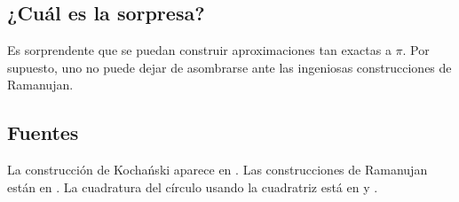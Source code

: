 \subsection*{¿Cuál es la sorpresa?}

Es sorprendente que se puedan construir aproximaciones tan exactas a $\pi$. Por supuesto, uno no puede dejar de asombrarse ante las ingeniosas construcciones de Ramanujan.

\subsection*{Fuentes}

La construcción de Kocha\'{n}ski aparece en \cite{bold}. Las construcciones de Ramanujan están en \cite{ramanujan1,ramanujan2}. La cuadratura del círculo usando la cuadratriz está en \cite[pp.~48--49]{martin} y \cite{wiki:quad}.
